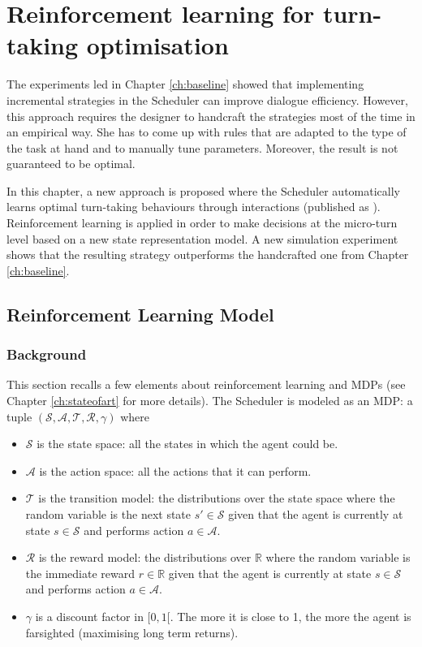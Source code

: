 \chapter{Reinforcement learning for turn-taking optimisation}
\label{ch:rl}

	The experiments led in Chapter \ref{ch:baseline} showed that implementing incremental strategies in the Scheduler can improve dialogue efficiency. However, this approach requires the designer to handcraft the strategies most of the time in an empirical way. She has to come up with rules that are adapted to the type of the task at hand and to manually tune parameters. Moreover, the result is not guaranteed to be optimal.
	
	In this chapter, a new approach is proposed where the Scheduler automatically learns optimal turn-taking behaviours through interactions (published as \cite{Khouzaimi2015b}). Reinforcement learning is applied in order to make decisions at the micro-turn level based on a new state representation model. A new simulation experiment shows that the resulting strategy outperforms the handcrafted one from Chapter \ref{ch:baseline}.

\section{Reinforcement Learning Model}

        \subsection{Background}

             This section recalls a few elements about reinforcement learning and MDPs (see Chapter \ref{ch:stateofart} for more details). The Scheduler is modeled as an MDP: a tuple $(\mathcal{S},\mathcal{A},\mathscr{T},\mathscr{R},\gamma)$ where

             \begin{itemize}
                \item $\mathcal{S}$ is the state space: all the states in which the agent could be.
                \item $\mathcal{A}$ is the action space: all the actions that it can perform.
                \item $\mathscr{T}$ is the transition model: the distributions over the state space where the random variable is the next state $s' \in \mathcal{S}$ given that the agent is currently at state $s \in \mathcal{S}$ and performs action $a \in \mathcal{A}$.
                \item $\mathscr{R}$ is the reward model: the distributions over $\mathbb{R}$ where the random variable is the immediate reward $r \in \mathbb{R}$ given that the agent is currently at state $s \in \mathcal{S}$ and performs action $a \in \mathcal{A}$.
                \item $\gamma$ is a discount factor in $[0,1[$. The more it is close to 1, the more the agent is farsighted (maximising long term returns).
             \end{itemize}

